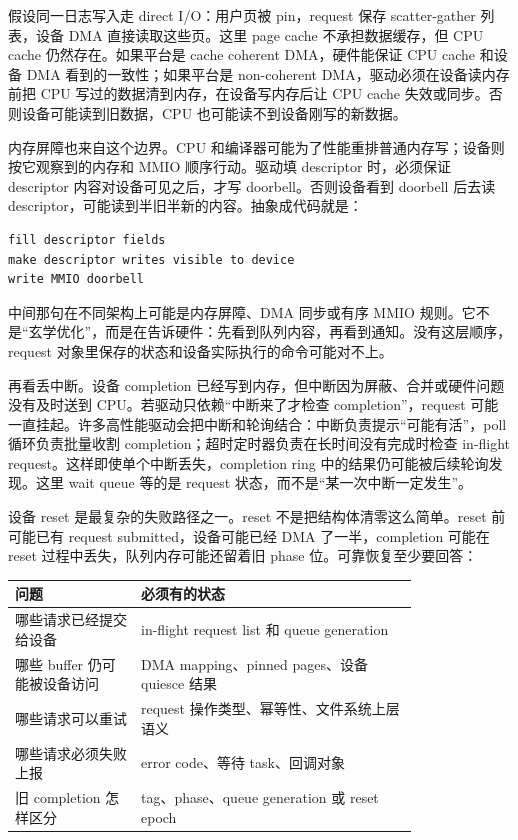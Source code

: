 假设同一日志写入走 direct I/O：用户页被 pin，request 保存 scatter-gather 列表，设备 DMA 直接读取这些页。这里 page cache 不承担数据缓存，但 CPU cache 仍然存在。如果平台是 cache coherent DMA，硬件能保证 CPU cache 和设备 DMA 看到的一致性；如果平台是 non-coherent DMA，驱动必须在设备读内存前把 CPU 写过的数据清到内存，在设备写内存后让 CPU cache 失效或同步。否则设备可能读到旧数据，CPU 也可能读不到设备刚写的新数据。

内存屏障也来自这个边界。CPU 和编译器可能为了性能重排普通内存写；设备则按它观察到的内存和 MMIO 顺序行动。驱动填 descriptor 时，必须保证 descriptor 内容对设备可见之后，才写 doorbell。否则设备看到 doorbell 后去读 descriptor，可能读到半旧半新的内容。抽象成代码就是：

\begin{lstlisting}
fill descriptor fields
make descriptor writes visible to device
write MMIO doorbell
\end{lstlisting}

中间那句在不同架构上可能是内存屏障、DMA 同步或有序 MMIO 规则。它不是“玄学优化”，而是在告诉硬件：先看到队列内容，再看到通知。没有这层顺序，request 对象里保存的状态和设备实际执行的命令可能对不上。

再看丢中断。设备 completion 已经写到内存，但中断因为屏蔽、合并或硬件问题没有及时送到 CPU。若驱动只依赖“中断来了才检查 completion”，request 可能一直挂起。许多高性能驱动会把中断和轮询结合：中断负责提示“可能有活”，poll 循环负责批量收割 completion；超时定时器负责在长时间没有完成时检查 in-flight request。这样即使单个中断丢失，completion ring 中的结果仍可能被后续轮询发现。这里 wait queue 等的是 request 状态，而不是“某一次中断一定发生”。

设备 reset 是最复杂的失败路径之一。reset 不是把结构体清零这么简单。reset 前可能已有 request submitted，设备可能已经 DMA 了一半，completion 可能在 reset 过程中丢失，队列内存可能还留着旧 phase 位。可靠恢复至少要回答：

\begin{longtable}{p{0.25\linewidth}p{0.55\linewidth}}
\toprule
问题 & 必须有的状态 \\
\midrule
哪些请求已经提交给设备 & in-flight request list 和 queue generation \\
哪些 buffer 仍可能被设备访问 & DMA mapping、pinned pages、设备 quiesce 结果 \\
哪些请求可以重试 & request 操作类型、幂等性、文件系统上层语义 \\
哪些请求必须失败上报 & error code、等待 task、回调对象 \\
旧 completion 怎样区分 & tag、phase、queue generation 或 reset epoch \\
\bottomrule
\end{longtable}

